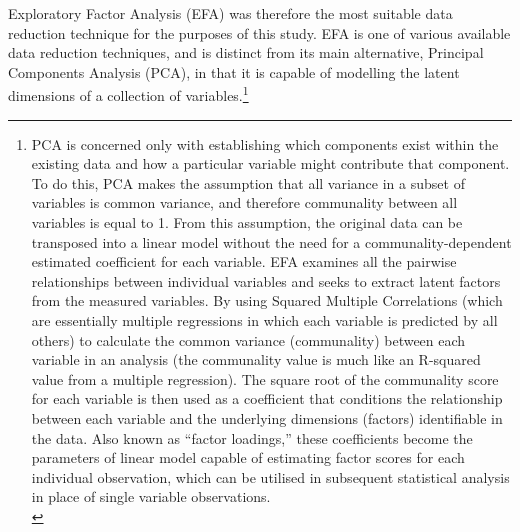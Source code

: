 \documentclass[12pt]{report}
\begin{document}
Exploratory Factor Analysis (EFA) was therefore the most suitable data reduction technique for the purposes of this study. EFA is one of various available data reduction techniques, and is distinct from its main alternative, Principal Components Analysis (PCA), in that it is capable of modelling the latent dimensions of a collection of variables.\footnote{PCA is concerned only with establishing which components exist within the existing data and how a particular variable might contribute that component. To do this, PCA makes the assumption that all variance in a subset of variables is common variance, and therefore communality between all variables is equal to 1. From this assumption, the original data can be transposed into a linear model without the need for a communality-dependent estimated coefficient for each variable\citep{Widaman2007}. EFA examines all the pairwise relationships between individual variables and seeks to extract latent factors from the measured variables. By using Squared Multiple Correlations (which are essentially multiple regressions in which each variable is predicted by all others) to calculate the common variance (communality) between each variable in an analysis (the communality value is much like an R-squared value from a multiple regression). The square root of the communality score for each variable is then used as a coefficient that conditions the relationship between each variable and the underlying dimensions (factors) identifiable in the data. Also known as ``factor loadings,'' these coefficients become the parameters of linear model capable of estimating factor scores for each individual observation, which can be utilised in subsequent statistical analysis in place of single variable observations.\\

}
\end{document}
